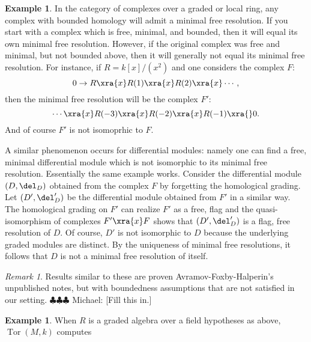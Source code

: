 \documentclass[12pt]{amsart}
\theoremstyle{definition}
\newtheorem{example}[lemma]{Example}
\theoremstyle{remark}
\newtheorem{rem}[lemma]{Remark}
\newcommand{\Tor}{\operatorname{Tor}}
\newcommand{\michael}[1]{{\color{red} \sf $\clubsuit\clubsuit\clubsuit$ Michael: [#1]}}
\begin{document}
\begin{example}
In the category of complexes over a graded or local ring, any complex with bounded homology will admit a minimal free resolution.  If you start with a complex which is free, minimal, and bounded, then it will equal its own minimal free resolution.  However, if the original complex was free and minimal, but not bounded above, then it will generally not equal its minimal free resolution.  For instance, if  $R = k[x]/(x^2)$ and one considers the complex $F$:
$$
0 \to R \xra{x} R(1) \xra{x} R(2) \xra{x} \cdots,
$$
then the minimal free resolution will be the complex $F'$:
$$
\cdots \xra{x} R(-3) \xra{x} R(-2) \xra{x} R(-1) \xra{} 0.
$$
And of course $F'$ is not isomoprhic to $F$.

A similar phenomenon occurs for differential modules: namely one can find a free, minimal differential module which is not isomorphic to its minimal free resolution.  Essentially the same example works.  Consider the differential module $(D, \del_D)$ obtained from the complex $F$ by forgetting the homological grading. Let $(D', \del_D')$ be the differential module obtained from $F'$ in a similar way.  The homological grading on $F'$ can realize $F'$ as a free, flag and the quasi-isomorphism of complexes $F'\xra{x} F$ shows that $(D', \del_D')$ is a flag, free resolution of $D$.  Of course, $D'$ is not isomorphic to $D$ because the underlying graded modules are distinct. By the uniqueness of minimal free resolutions,  it follows that $D$ is not a minimal free resolution of itself. 
\end{example}

\begin{rem}
Results similar to these are proven Avramov-Foxby-Halperin's unpublished notes, but with boundedness assumptions that are not satisfied in our setting. \michael{Fill this in.}
\end{rem}

\begin{example}
When $R$ is a graded algebra over a field hypotheses as above, $\Tor(M,k)$ computes
\end{example}
\end{document}
